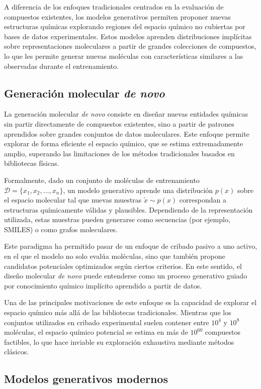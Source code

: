 \documentclass[IB]{TFUOC}%
\begin{document}
A diferencia de los enfoques tradicionales centrados en la evaluación de compuestos existentes, los modelos generativos permiten proponer nuevas estructuras químicas explorando regiones del espacio químico no cubiertas por bases de datos experimentales. Estos modelos aprenden distribuciones implícitas sobre representaciones moleculares a partir de grandes colecciones de compuestos, lo que les permite generar nuevas moléculas con características similares a las observadas durante el entrenamiento.

\subsection{Generación molecular \textit{de novo}}

La generación molecular \textit{de novo} consiste en diseñar nuevas entidades químicas sin partir directamente de compuestos existentes, sino a partir de patrones aprendidos sobre grandes conjuntos de datos moleculares. Este enfoque permite explorar de forma eficiente el espacio químico, que se estima extremadamente amplio, superando las limitaciones de los métodos tradicionales basados en bibliotecas físicas.

Formalmente, dado un conjunto de moléculas de entrenamiento $\mathcal{D} = \{x_1, x_2, \dots, x_n\}$, un modelo generativo aprende una distribución $p(x)$ sobre el espacio molecular tal que nuevas muestras $\tilde{x} \sim p(x)$ correspondan a estructuras químicamente válidas y plausibles. Dependiendo de la representación utilizada, estas muestras pueden generarse como secuencias (por ejemplo, SMILES) o como grafos moleculares.

Este paradigma ha permitido pasar de un enfoque de cribado pasivo a uno activo, en el que el modelo no solo evalúa moléculas, sino que también propone candidatos potenciales optimizados según ciertos criterios. En este sentido, el diseño molecular \textit{de novo} puede entenderse como un proceso generativo guiado por conocimiento químico implícito aprendido a partir de datos.

Una de las principales motivaciones de este enfoque es la capacidad de explorar el espacio químico más allá de las bibliotecas tradicionales. Mientras que los conjuntos utilizados en cribado experimental suelen contener entre $10^4$ y $10^8$ moléculas, el espacio químico potencial se estima en más de $10^{60}$ compuestos factibles, lo que hace inviable su exploración exhaustiva mediante métodos clásicos.

\subsection{Modelos generativos modernos}
\end{document}
